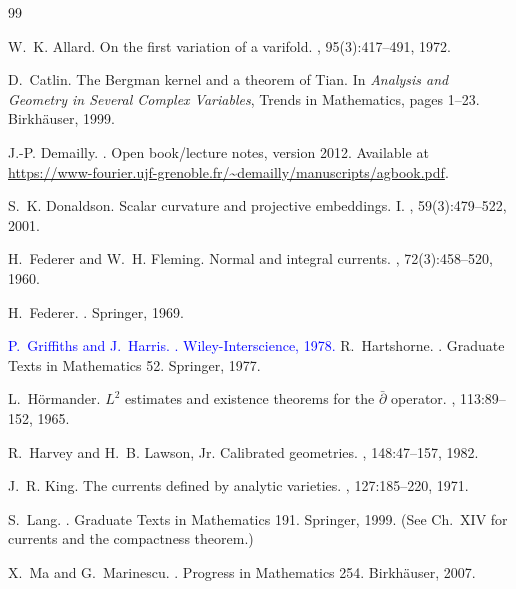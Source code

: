 \documentclass[11pt]{article}
\newcommand{\REV}[1]{\textcolor{blue}{#1}}
\numberwithin{equation}{section}  %
\theoremstyle{plain}
\theoremstyle{definition}
\theoremstyle{remark}
\begin{document}
\begin{thebibliography}{99}

W.~K. Allard.
\newblock On the first variation of a varifold.
, 95(3):417--491, 1972.

D.~Catlin.
\newblock The Bergman kernel and a theorem of Tian.
\newblock In {\em Analysis and Geometry in Several Complex Variables}, Trends in Mathematics,
pages 1--23. Birkh\"auser, 1999.

J.-P. Demailly.
.
\newblock Open book/lecture notes, version 2012. Available at \url{https://www-fourier.ujf-grenoble.fr/~demailly/manuscripts/agbook.pdf}.

S.~K. Donaldson.
\newblock Scalar curvature and projective embeddings. I.
, 59(3):479--522, 2001.

H.~Federer and W.~H. Fleming.
\newblock Normal and integral currents.
, 72(3):458--520, 1960.

H.~Federer.
.
\newblock Springer, 1969.

\REV{P.~Griffiths and J.~Harris.
\newblock {\em Principles of Algebraic Geometry}.
\newblock Wiley-Interscience, 1978.}
R.~Hartshorne.
.
\newblock Graduate Texts in Mathematics 52. Springer, 1977.

L.~H\"ormander.
\newblock $L^2$ estimates and existence theorems for the $\bar\partial$ operator.
, 113:89--152, 1965.

R.~Harvey and H.~B. Lawson, Jr.
\newblock Calibrated geometries.
, 148:47--157, 1982.

J.~R. King.
\newblock The currents defined by analytic varieties.
, 127:185--220, 1971.

S.~Lang.
.
\newblock Graduate Texts in Mathematics 191. Springer, 1999.
\newblock (See Ch.~XIV for currents and the compactness theorem.)

X.~Ma and G.~Marinescu.
.
\newblock Progress in Mathematics 254. Birkh\"auser, 2007.


\end{thebibliography}
\end{document}
